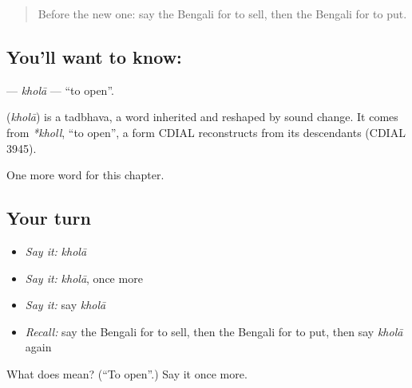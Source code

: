 \label{lesson:BN-C49-khola}



\begin{quote}
Before the new one: say the Bengali for to sell, then the Bengali for to put.
\end{quote}

\subsection*{You'll want to know: }
\textbf{} — \emph{kholā} — \textquotedblleft{}to open\textquotedblright{}.

\begin{cousinweb}
\textbf{} (\emph{kholā}) is a tadbhava, a word inherited and reshaped by sound change. It comes from \emph{*kholl}, \textquotedblleft{}to open\textquotedblright{}, a form CDIAL reconstructs from its descendants (CDIAL 3945).
\end{cousinweb}

\begin{grammarlens}[title={What you've built}]
One more word for this chapter.
\end{grammarlens}

\subsection*{Your turn}
\begin{itemize}
\raggedright
  \item \emph{Say it:} \emph{kholā}
  \item \emph{Say it:} \emph{kholā}, once more
  \item \emph{Say it:} say \emph{kholā}
  \item \emph{Recall:} say the Bengali for to sell, then the Bengali for to put, then say \emph{kholā} again
\end{itemize}

\begin{tcolorbox}[breakable,colback=teal!4,colframe=teal!35!black,title={Before you move on}]
What does  mean? (\textquotedblleft{}To open\textquotedblright{}.) Say it once more.
\end{tcolorbox}
